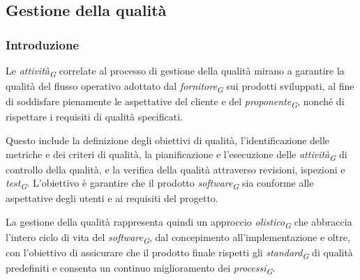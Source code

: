 \subsection{Gestione della qualità}
\subsubsection{Introduzione}
Le \textit{attività}\textsubscript{\textit{G}} correlate al processo di gestione della qualità mirano a garantire la qualità del flusso operativo adottato dal \textit{fornitore}\textsubscript{\textit{G}} sui prodotti sviluppati, al fine di soddisfare pienamente le aspettative del cliente e del \textit{proponente}\textsubscript{\textit{G}}, nonché di rispettare i requisiti di qualità specificati.

Questo include la definizione degli obiettivi di qualità, l'identificazione delle metriche e dei criteri di qualità, la pianificazione e l'esecuzione delle \textit{attività}\textsubscript{\textit{G}} di controllo della qualità, e la verifica della qualità attraverso revisioni, ispezioni e \textit{test}\textsubscript{\textit{G}}. L'obiettivo è garantire che il prodotto \textit{software}\textsubscript{\textit{G}} sia conforme alle aspettative degli utenti e ai requisiti del progetto.

\vspace{0.2cm}

La gestione della qualità rappresenta quindi un approccio \textit{olistico}\textsubscript{\textit{G}} che abbraccia l'intero ciclo di vita del \textit{software}\textsubscript{\textit{G}}, dal concepimento all'implementazione e oltre, con l'obiettivo di assicurare che il prodotto finale rispetti gli \textit{standard}\textsubscript{\textit{G}} di qualità predefiniti e consenta un continuo miglioramento dei \textit{processi}\textsubscript{\textit{G}}.
\pagebreak

